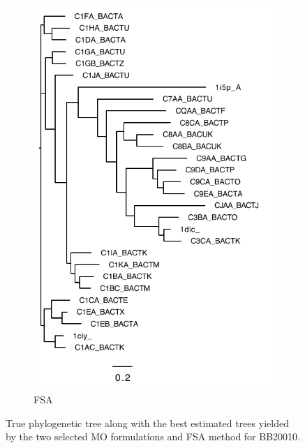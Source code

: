 \begin{figure}[!h]
\begin{adjustwidth}{-1cm}{-1cm}
\begin{subfigure}[b]{0.25\textwidth}
			\includegraphics[width=\columnwidth]{Figure/tree/BB20010_fsa_tree}
			\caption{FSA}
\end{subfigure}
	\end{adjustwidth}
	\caption{ True phylogenetic tree along with the best estimated trees yielded by the two selected MO formulations and FSA method for BB20010.}
	\label{fig:bb20010_trees}
\end{figure}
